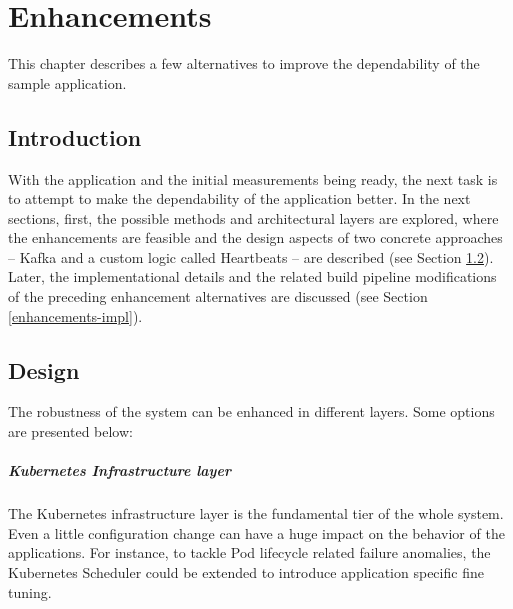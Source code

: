 \chapter{Enhancements} \label{enhancements}

This chapter describes a few alternatives to improve the dependability of the sample application.

\section{Introduction}

With the application and the initial measurements being ready, the next task is to attempt to make the dependability of the application better. In the next sections, first, the possible methods and architectural layers are explored, where the enhancements are feasible and the design aspects of two concrete approaches -- Kafka and a custom logic called Heartbeats -- are described (see Section \ref{enhancements-design}). Later, the implementational details and the related build pipeline modifications of the preceding enhancement alternatives are discussed (see Section \ref{enhancements-impl}).

\section{Design} \label{enhancements-design}


The robustness of the system can be enhanced in different layers. Some options are presented below:

\paragraph{Kubernetes Infrastructure layer} The Kubernetes infrastructure layer is the fundamental tier of the whole system. Even a little configuration change can have a huge impact on the behavior of the applications. For instance, to tackle Pod lifecycle related failure anomalies, the Kubernetes Scheduler could be extended to introduce application specific fine tuning.

